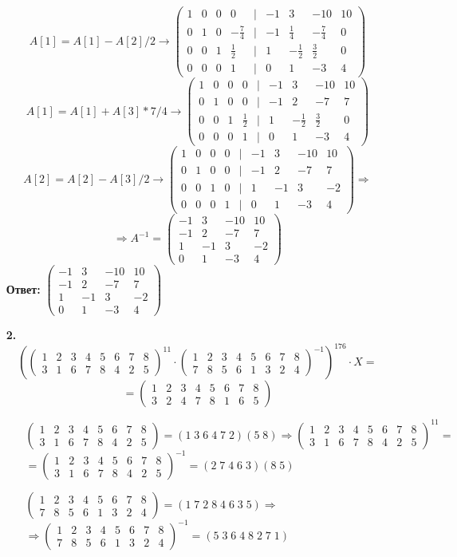 \documentclass[a4paper]{article}
\newcommand{\mat}[1]{\begin{pmatrix} #1 \end{pmatrix}}
\renewcommand{\r}{\Rightarrow}
\begin{document}
\begin{enumerate}
    $$A[1] = A[1]-A[2]/2 \to \mat{1 & 0 & 0 & 0 & | & -1 & 3 & -10 & 10 \\ 0 & 1 & 0 & -\frac{7}{4} & | & -1 & \frac{1}{4} & -\frac{7}{4} & 0 \\ 0 & 0 & 1 & \frac{1}{2} & | & 1 & -\frac{1}{2} & \frac{3}{2} & 0 \\ 0 & 0 & 0 & 1 & | & 0 & 1 & -3 & 4}$$
    $$A[1] = A[1]+A[3]*7/4 \to \mat{1 & 0 & 0 & 0 & | & -1 & 3 & -10 & 10 \\ 0 & 1 & 0 & 0 & | & -1 & 2 & -7 & 7 \\ 0 & 0 & 1 & \frac{1}{2} & | & 1 & -\frac{1}{2} & \frac{3}{2} & 0 \\ 0 & 0 & 0 & 1 & | & 0 & 1 & -3 & 4}$$
    $$A[2] = A[2]-A[3]/2 \to \mat{1 & 0 & 0 & 0 & | & -1 & 3 & -10 & 10 \\ 0 & 1 & 0 & 0 & | & -1 & 2 & -7 & 7 \\ 0 & 0 & 1 & 0 & | & 1 & -1 & 3 & -2 \\ 0 & 0 & 0 & 1 & | & 0 & 1 & -3 & 4} \r$$
    $$\r A^{-1} = \mat{-1 & 3 & -10 & 10 \\ -1 & 2 & -7 & 7 \\ 1 & -1 & 3 & -2 \\ 0 & 1 & -3 & 4}$$
    \textbf{Ответ: }$\mat{-1 & 3 & -10 & 10 \\ -1 & 2 & -7 & 7 \\ 1 & -1 & 3 & -2 \\ 0 & 1 & -3 & 4}$\\

    \item[\textbf{2.}]
    $$\left(\mat{1 & 2 & 3 & 4 & 5 & 6 & 7 & 8 \\ 3 & 1 & 6 & 7 & 8 & 4 & 2 & 5}^{11}\cdot \mat{1 & 2 & 3 & 4 & 5 & 6 & 7 & 8 \\ 7 & 8 & 5 & 6 & 1 & 3 & 2 & 4}^{-1}\right)^{176} \cdot X = $$
    $$ = \mat{1 & 2 & 3 & 4 & 5 & 6 & 7 & 8 \\ 3 & 2 & 4 & 7 & 8 & 1 & 6 & 5}$$
    \begin{enumerate}
        \item[]
        $\mat{1 & 2 & 3 & 4 & 5 & 6 & 7 & 8 \\ 3 & 1 & 6 & 7 & 8 & 4 & 2 & 5}=(1 \; 3 \; 6\; 4\; 7\; 2)(5 \; 8) \r \mat{1 & 2 & 3 & 4 & 5 & 6 & 7 & 8 \\ 3 & 1 & 6 & 7 & 8 & 4 & 2 & 5}^{11} = $
        $=\mat{1 & 2 & 3 & 4 & 5 & 6 & 7 & 8 \\ 3 & 1 & 6 & 7 & 8 & 4 & 2 & 5}^{-1} = (2\;7\;4\;6\;3)(8\;5)$\\
        \item[]
        $\mat{1 & 2 & 3 & 4 & 5 & 6 & 7 & 8 \\ 7 & 8 & 5 & 6 & 1 & 3 & 2 & 4} = (1 \; 7\; 2\; 8\; 4\; 6\; 3\; 5) \r$ \\
        $\r \mat{1 & 2 & 3 & 4 & 5 & 6 & 7 & 8 \\ 7 & 8 & 5 & 6 & 1 & 3 & 2 & 4}^{-1} = (5\;3\;6\;4\;8\;2\;7\;1)$
    

\end{enumerate}
\end{enumerate}
\end{document}
